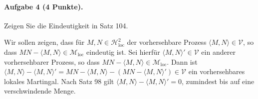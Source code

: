 \documentclass{article}
\begin{document}
\paragraph{Aufgabe 4 \textnormal{(4 Punkte)}.}
Zeigen Sie die Eindeutigkeit in Satz 104.

Wir sollen zeigen, dass für $M,N\in\mathscr{H}^2_{\text{loc}}$ der vorhersehbare Prozess $\langle M,N\rangle\in\mathscr{V}$, so dass $MN-\langle M,N\rangle\in\mathscr{M}_{\text{loc}}$ eindeutig ist.
Sei hierfür $\langle M,N\rangle'\in\mathscr{V}$ ein anderer vorhersehbarer Prozess, so dass $MN-\langle M,N\rangle\in\mathscr{M}_{\text{loc}}$.
Dann ist $\langle M,N\rangle-\langle M,N\rangle'=MN-\langle M,N\rangle-(MN-\langle M,N\rangle')\in\mathscr{V}$ ein vorhersehbares lokales Martingal.
Nach Satz 98 gilt $\langle M,N\rangle-\langle M,N\rangle'=0$, zumindest bis auf eine verschwindende Menge.

\end{document}
